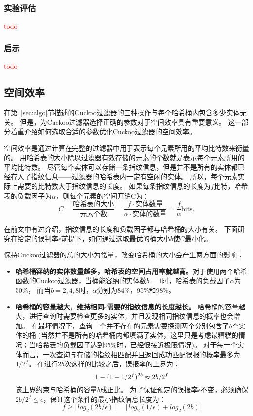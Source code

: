 \subsubsection{实验评估}
\textcolor{red}{todo}
\subsubsection{启示}
\textcolor{red}{todo}

\subsection{空间效率}
在第~\ref{sec:algo}节描述的Cuckoo过滤器的三种操作与每个哈希桶内包含多少实体无关。
但是，为Cuckoo过滤器选择正确的参数对于空间效率具有重要意义。
这一部分着重介绍如何选取合适的参数优化Cuckoo过滤器的空间效率。

空间效率是通过计算在完整的过滤器中用于表示每个元素所用的平均比特数来衡量的。
用哈希表的大小除以过滤器有效存储的元素的个数就是表示每个元素所用的平均比特数。
尽管每个实体可以存储一条指纹信息，但是并不是所有的实体都已经存入了指纹信息——过滤器的哈希表内一定有空闲的实体。
所以，每个元素实际上需要的比特数大于指纹信息的长度。
如果每条指纹信息的长度为$f$比特，哈希表的负载因子为$\alpha$，则每个元素的空间开销C为：
\begin{equation}
C = \frac{\text{哈希表的大小}}{\text{元素个数}} = \frac{f\cdot \text{实体数量}}{\alpha \cdot \text{实体的数量}} = \frac{f}{\alpha} \text{bits.}
\label{equ:space_cost}
\end{equation}

在前文中有过介绍，指纹信息的长度和负载因子都与哈希桶的大小有关。
下面研究在给定的误判率$\epsilon$前提下，如何通过选取最优的桶大小$b$使$C$最小化。

保持Cuckoo过滤器的总的大小为常量，改变哈希桶的大小会产生两方面的影响：
\begin{itemize}
\item \textbf{哈希桶容纳的实体数量越多，哈希表的空间占用率就越高。}对于使用两个哈希函数的Cuckoo过滤器，当桶能容纳的实体数$b = 1$时，哈希表的负载因子$\alpha$为50\%，
而当$b = 2,4,8$时，$\alpha$分别为84\%，95\%和98\%。
\item \textbf{哈希桶的容量越大，维持相同$\epsilon$需要的指纹信息的长度越长。}
哈希桶的容量越大，进行查询时需要检查更多的实体，并且发现相同指纹信息的概率也会增加。
在最坏情况下，查询一个并不存在的元素需要探测两个分别包含了$b$个实体的桶
(当然并不是所有的哈希桶内都填满了实体，这里只是考虑最糟糕的情况；当哈希表的负载因子达到95\%时，已经很接近极限情况)。
对于每一个实体而言，一次查询与存储的指纹相匹配并且返回成功匹配误报的概率最多为${1/2^f}$。
在进行$2b$次这样的比较之后，误报率的上界为：
\begin{equation}
1 - (1 - {1/2^f})^{2b} \thickapprox {2b/2^f}
\end{equation}
该上界约束与哈希桶的容量$b$成正比。
为了保证预定的误报率$\epsilon$不变，必须确保${2b/2^f}\leq \epsilon$，保证这个条件的最小指纹信息长度为：
\begin{equation}
f \geq \lceil log_2({2b/\epsilon})\rceil = \lceil log_2({1/\epsilon}) + log_2(2b)\rceil  
\label{equ:upper_f}
\end{equation}
\end{itemize}


